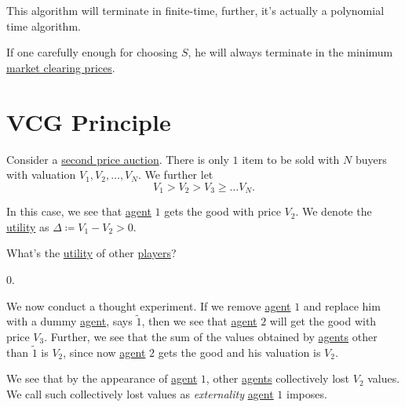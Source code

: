 \begin{remark}
	This algorithm will terminate in finite-time, further, it's actually a polynomial time algorithm.
\end{remark}

If one carefully enough for choosing \(S\), he will always terminate in the minimum \hyperref[note:market-clearing-prices]{market clearing prices}.

\section{VCG Principle}
Consider a \hyperref[eg:second-price-auction]{second price auction}. There is only \(1\) item to be sold with \(N\) buyers with valuation
\(V_{1}, V_{2}, \ldots , V_{N}\). We further let
\[
	V_{1}>V_{2}>V_{3}\geq \ldots V_{N}.
\]

In this case, we see that \hyperref[def:player]{agent} \(1\) gets the good with price \(V_{2}\). We denote the \hyperref[def:reward]{utility}
as \(\Delta\coloneqq V_{1}-V_{2}>0\).

\begin{problem}
What's the \hyperref[def:reward]{utility} of other \hyperref[def:player]{players}?
\end{problem}
\begin{answer}
	\(0\).
\end{answer}

We now conduct a thought experiment. If we remove \hyperref[def:player]{agent} \(1\) and replace him with a dummy \hyperref[def:player]{agent},
says \(\tilde{1}\), then we see that \hyperref[def:player]{agent} \(2\) will get the good with price \(V_{3}\). Further, we see that the sum of
the values obtained by \hyperref[def:player]{agents} other than \(\tilde{1}\) is \(V_{2}\), since now \hyperref[def:player]{agent} \(2\) gets
the good and his valuation is \(V_{2}\).

We see that by the appearance of \hyperref[def:player]{agent} \(1\), other \hyperref[def:player]{agents} collectively lost \(V_{2}\) values.
We call such collectively lost values as \emph{externality} \hyperref[def:player]{agent} \(1\) imposes.

